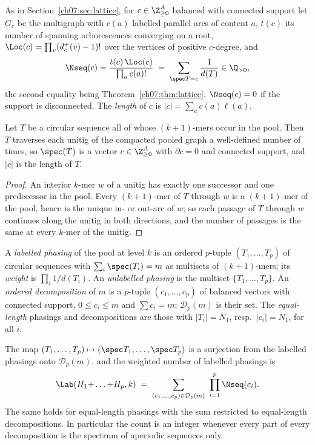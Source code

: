 \begin{definition}\label{ch13:def:nseq}
As in Section~\ref{ch07:sec:lattice}, for $c\in\Z^A_{\ge0}$ balanced with connected support let $G_c$ be the multigraph with $c(a)$
labelled parallel arcs of content $a$, $t(c)$ its number of spanning arborescences
converging on a root, $\Loc(c)=\prod_v(d^+_c(v)-1)!$ over the vertices of positive $c$-degree,
and
\[
  \Nseq(c)=\frac{t(c)\,\Loc(c)}{\prod_a c(a)!}\;=\;\sum_{\spec T=c}\frac1{d(T)}\in\Q_{>0},
\]
the second equality being Theorem~\ref{ch07:thm:lattice}. $\Nseq(c)=0$ if the support is disconnected.
The \emph{length} of $c$ is $|c|=\sum_a c(a)\ell(a)$.
\end{definition}

\begin{lemma}\label{ch13:lem:spectrum}
Let $T$ be a circular sequence all of whose $(k{+}1)$-mers occur in the pool. Then $T$
traverses each unitig of the compacted pooled graph a well-defined number of times, so
$\spec(T)$ is a vector $c\in\Z^A_{\ge0}$ with $\partial c=0$ and connected support, and
$|c|$ is the length of $T$.
\end{lemma}

\begin{proof}
An interior $k$-mer $w$ of a unitig has exactly one successor and one predecessor in the pool.
Every $(k{+}1)$-mer of $T$ through $w$ is a $(k{+}1)$-mer of the pool, hence is the unique
in- or out-arc of $w$; so each passage of $T$ through $w$ continues along the unitig in both
directions, and the number of passages is the same at every $k$-mer of the unitig.
\end{proof}

\begin{definition}\label{ch13:def:phasing}
A \emph{labelled phasing} of the pool at level $k$ is an ordered $p$-tuple $(T_1,\dots,T_p)$
of circular sequences with $\sum_i\spec(T_i)=m$ as multisets of $(k{+}1)$-mers; its
\emph{weight} is $\prod_i 1/d(T_i)$. An \emph{unlabelled phasing} is the multiset
$\{T_1,\dots,T_p\}$. An \emph{ordered decomposition} of $m$ is a $p$-tuple
$(c_1,\dots,c_p)$ of balanced vectors with connected support, $0\le c_i\le m$ and
$\sum c_i=m$; $\mathcal D_p(m)$ is their set. The \emph{equal-length} phasings and
decompositions are those with $|T_i|=N_1$, resp.\ $|c_i|=N_1$, for all $i$.
\end{definition}

\begin{theorem}\label{ch13:thm:lattice}
The map $(T_1,\dots,T_p)\mapsto(\spec T_1,\dots,\spec T_p)$ is a surjection from the labelled
phasings onto $\mathcal D_p(m)$, and the weighted number of labelled phasings is
\[
  \Lab(H_1{+}\dots{+}H_p,k)\;=\;\sum_{(c_1,\dots,c_p)\in\mathcal D_p(m)}\ \prod_{i=1}^p\Nseq(c_i).
\]
The same holds for equal-length phasings with the sum restricted to equal-length
decompositions. In particular the count is an integer whenever every part of every
decomposition is the spectrum of aperiodic sequences only.
\end{theorem}

